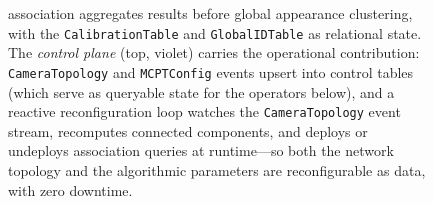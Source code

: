 \documentclass[review]{elsarticle}
\begin{document}
\begin{figure}[tbh!]
{association aggregates results before global appearance clustering, with the
\texttt{CalibrationTable} and \texttt{GlobalIDTable} as relational state. The \emph{control
plane} (top, violet) carries the operational contribution: \texttt{CameraTopology} and
\texttt{MCPTConfig} events upsert into control tables (which serve as queryable state for the
operators below), and a reactive reconfiguration loop watches the \texttt{CameraTopology}
event stream, recomputes connected components, and deploys or undeploys association queries
at runtime---so both the network topology and the algorithmic parameters are reconfigurable as
data, with zero downtime.}
\label{fig:architecture}
\end{figure}
 
 
\end{document}
